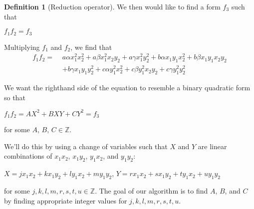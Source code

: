 \documentclass{article}
\theoremstyle{definition}
\newtheorem{definition}{Definition}[section]
\theoremstyle{theorem}
\theoremstyle{example}
\theoremstyle{corollary}
\begin{document}
\begin{definition}[Reduction operator]
\bigskip

We then would like to find a form \(f_{3}\) such that
\begin{center}
\(f_{1} f_{2} = f_{3}\)
\end{center}

\bigskip

Multiplying \(f_{1}\) and \(f_{2}\), we find that
\begin{align*}
f_{1} f_{2} = \, \, & a \alpha x_{1}^{2} x_{2}^{2} + a \beta x_{1}^{2} x_{2} y_{2} + a \gamma x_{1}^{2} y_{2}^{2} + b \alpha x_{1} y_{1} x_{2}^{2} + b \beta x_{1} y_{1} x_{2} y_{2} \\
&+ b \gamma x_{1} y_{1} y_{2}^{2} + c \alpha y_{1}^{2} x_{2}^{2} + c \beta y_{1}^{2} x_{2} y_{2} + c \gamma y_{1}^{2} y_{2}^{2}
\end{align*}

\bigskip

We want the righthand side of the equation to resemble a binary quadratic form so that
\begin{center}
\(f_{1} f_{2} = A X^{2} + B X Y + C Y^{2} = f_{3}\)
\end{center}
for some \(A\), \(B\), \(C \in \mathbb{Z}\).

\bigskip

We'll do this by using a change of variables such that \(X\) and \(Y\) are linear combinations of \(x_{1} x_{2}\), \(x_{1} y_{2}\), \(y_{1} x_{2}\), and \(y_{1} y_{2}\):
\begin{center}
\(X = j x_{1} x_{2} + k x_{1} y_{2} + l y_{1} x_{2} + m y_{1} y_{2}\), \quad \(Y = r x_{1} x_{2} + s x_{1} y_{2} + t y_{1} x_{2} + u y_{1} y_{2}\)
\end{center}
for some \(j, k, l, m, r, s, t, u \in \mathbb{Z}\). The goal of our algorithm is to find \(A\), \(B\), and \(C\) by finding appropriate integer values for \(j, k, l, m, r, s, t, u\).

\bigskip


\end{definition}
\end{document}
